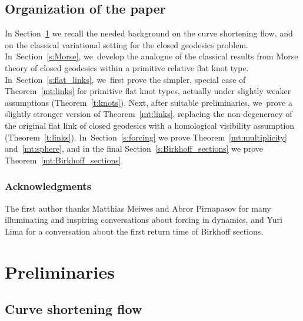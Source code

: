 \documentclass[JEP,XML,SOM,Unicode,NoFloatCountersInSection,published]{cedram}
\theoremstyle{plain}
\theoremstyle{definition}
\begin{document}
\subsection{Organization of the paper}
In Section~\ref{s:preliminaries} we recall the needed background on the curve shortening flow, and on the classical variational setting for the closed geodesics problem. In~Section~\ref{s:Morse}, we~develop the analogue of the classical results from Morse theory of closed geodesics within a primitive relative flat knot type. In~Section~\ref{s:flat_links}, we~first prove the simpler, special case of Theorem~\ref{mt:links} for primitive flat knot types, actually under slightly weaker assumptions (Theorem~\ref{t:knots}). Next, after suitable preliminaries, we~prove a slightly stronger version of Theorem~\ref{mt:links}, replacing the non-degeneracy of the original flat link of closed geodesics with a homological visibility assumption (Theorem~\ref{t:links}). In~Section~\ref{s:forcing} we prove Theorem~\ref{mt:multiplicity} and~\ref{mt:sphere}, and in the final Section~\ref{s:Birkhoff_sections} we prove Theorem~\ref{mt:Birkhoff_sections}.

\subsubsection*{Acknowledgments}
The first author thanks Matthias Meiwes and Abror
Pirnapasov for many illuminating and inspiring conversations about forcing in dynamics, and Yuri Lima for a conversation about the first return time of Birkhoff sections.

\section{Preliminaries}\label{s:preliminaries}

\subsection{Curve shortening flow}
\label{ss:curve_shortening}
\end{document}

